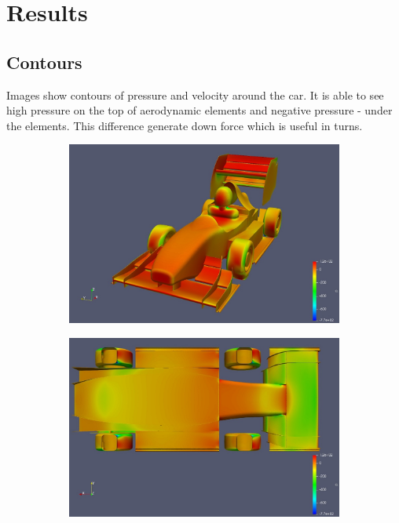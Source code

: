 \section{Results}
\subsection{Contours}
Images show contours of pressure and velocity around the car. It is able to see high pressure on the top of aerodynamic elements and negative pressure - under the elements. This difference generate down force which is useful in turns.
\begin{figure}[h!]
	\centering
    \begin{subfigure}[b]{0.48\textwidth}
    \includegraphics[width=\textwidth]{cis.jpg}
    \end{subfigure}
    \begin{subfigure}[b]{0.48\textwidth}
    	\includegraphics[width=\textwidth]{cis2.jpg}

\end{subfigure}
\end{figure}
